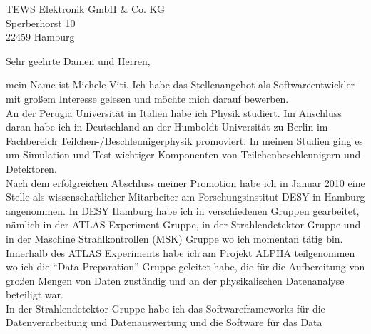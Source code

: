\documentclass[ebner,paper=a4,fontsize=11pt,ngerman,BCOR=10mm]{scrlttr2}%
\begin{document}
\pagestyle{empty}

\begin{letter}{TEWS Elektronik GmbH \& Co. KG\\
Sperberhorst 10\\
22459 Hamburg}


\setlength{\parindent}{15pt}

\opening{Sehr geehrte Damen und Herren,} 

mein Name ist Michele Viti. Ich habe das Stellenangebot als Softwareentwickler
mit gro{\ss}em Interesse gelesen und m{\"o}chte mich darauf bewerben. \\
% 
% 
% 
\indent An der Perugia Universit\"at in Italien habe ich Physik studiert. Im
Anschluss daran habe ich in Deutschland an der Humboldt Universit\"at
zu Berlin im Fachbereich Teilchen-/Beschleunigerphysik promoviert. In
meinen Studien ging es um Simulation und Test wichtiger
Komponenten von Teilchenbeschleunigern und Detektoren.\\
\indent Nach dem erfolgreichen Abschluss meiner Promotion habe ich in Januar
2010 eine Stelle als wissenschaftlicher Mitarbeiter am Forschungsinstitut DESY
in Hamburg angenommen. In DESY Hamburg habe ich in verschiedenen Gruppen
gearbeitet, n{\"a}mlich in der ATLAS Experiment Gruppe, in der Strahlendetektor
Gruppe und in der Maschine Strahlkontrollen (MSK) Gruppe wo ich momentan
t{\"a}tig bin. \\
Innerhalb des ATLAS Experiments habe ich am Projekt ALPHA teilgenommen wo
ich die "`Data Preparation"' Gruppe geleitet habe, die f{\"u}r die Aufbereitung
von gro{\ss}en Mengen von Daten zust{\"a}ndig und an der physikalischen
Datenanalyse beteiligt war.\\
In der Strahlendetektor Gruppe habe ich das Softwareframeworks f\"ur die
Datenverarbeitung und Datenauswertung und die Software f{\"u}r das Data

\end{letter}
\end{document}
